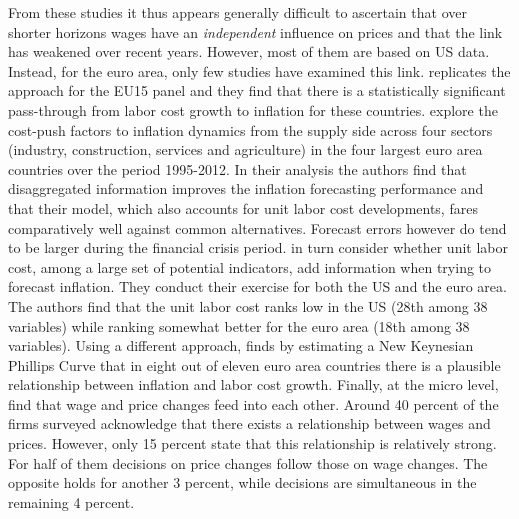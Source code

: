 \documentclass[11pt]{article}
\begin{document}
From these studies it thus appears generally difficult to ascertain that over shorter horizons wages have an \textit{independent} influence on prices and that the link has weakened over recent years. However, most of them are based on US data. Instead, for the euro area, only few studies have examined this link. \cite{IMF18} replicates the \cite{Peneva_Rudd_2017} approach for the EU15 panel and they find that there is a statistically significant pass-through from labor cost growth to inflation for these countries. \cite{Dees_Gunter_14} explore the cost-push factors to inflation dynamics from the supply side across four sectors (industry, construction, services and agriculture) in the four largest euro area countries over the period 1995-2012. In their analysis the authors find that disaggregated information improves the inflation forecasting performance and that their model, which also accounts for unit labor cost developments, fares comparatively well against common alternatives. Forecast errors however do tend to be larger during the financial crisis period. \cite{JarocinskiMackowiak2017} in turn consider whether unit labor cost, among a large set of potential indicators, add information when trying to forecast inflation. They conduct their exercise for both the US and the euro area. The authors find that the unit labor cost ranks low in the US (28th among 38 variables) while ranking somewhat better for the euro area (18th among 38 variables). Using a different approach, \cite{Tatierska_2010} finds by estimating a New Keynesian Phillips Curve that in eight out of eleven euro area countries there is a plausible relationship between inflation and labor cost growth. Finally, at the micro level, \cite{WDN2009} find that wage and price changes feed into each other. Around 40 percent of the firms surveyed acknowledge that there exists a relationship between wages and prices. However, only 15 percent state that this relationship is relatively strong. For half of them decisions on price changes follow those on wage changes. The opposite holds for another 3 percent, while decisions are simultaneous in the remaining 4 percent. 

\end{document}

